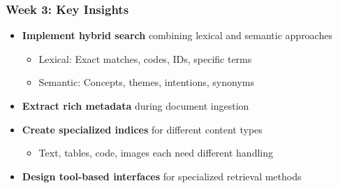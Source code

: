 \begin{frame}
    \frametitle{Week 3: Key Insights}
    
    \begin{center}
    \end{center}
    
    \begin{itemize}
        \item \textbf{Implement hybrid search} combining lexical and semantic approaches
        \begin{itemize}
            \item Lexical: Exact matches, codes, IDs, specific terms
            \item Semantic: Concepts, themes, intentions, synonyms
        \end{itemize}
        \item \textbf{Extract rich metadata} during document ingestion
        \item \textbf{Create specialized indices} for different content types
        \begin{itemize}
            \item Text, tables, code, images each need different handling
        \end{itemize}
        \item \textbf{Design tool-based interfaces} for specialized retrieval methods
    \end{itemize}
    
    \begin{center}
    \end{center}
\end{frame}


